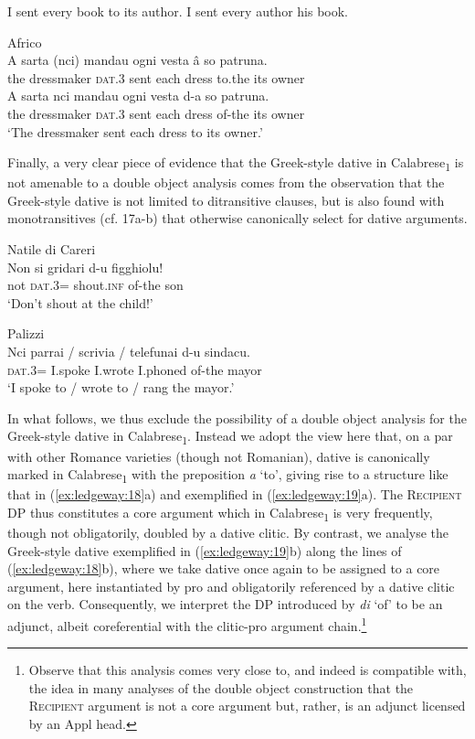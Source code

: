 \documentclass[output=paper,modfonts,nonflat]{langsci/langscibook}
\begin{document}
\ea\label{ex:ledgeway:15}
\ea I sent every book to its author.  
\ex I sent every author his book.
\z
\z

\ea\label{ex:ledgeway:16}
  Africo\\
\ea
	\gll A  sarta  (nci)  mandau  ogni  vesta  â  so patruna.\\
      the  dressmaker  \textsc{dat}.3  sent  each  dress  to.the  its  owner\\
\ex
	\gll A  sarta  nci  mandau  ogni  vesta  d-a  so patruna.\\
      the  dressmaker  \textsc{dat}.3  sent  each  dress  of-the  its     owner\\
      \glt `The dressmaker sent each dress to its owner.'
      \z
      \z

Finally, a very clear piece of evidence that the Greek-style dative in Calabrese\textsubscript{1} is not amenable to a double object analysis comes from the observation that the Greek-style dative is not limited to ditransitive clauses, but is also found with monotransitives (cf. 17a-b) that otherwise canonically select for dative arguments.

\ea\label{ex:ledgeway:17}
\ea Natile di Careri\\
 \gll Non  si  gridari  d-u  figghiolu!\\
    not  \textsc{dat}.3=  shout.\textsc{inf}  of-the  son\\
     \glt `Don’t shout at the child!'

\ex Palizzi  \\
    \gll Nci  parrai  /  scrivia  /  telefunai  d-u  sindacu.\\
    \textsc{dat}.3=  I.spoke    I.wrote    I.phoned  of-the  mayor\\
    \glt `I spoke to / wrote to / rang the mayor.'
    \z
    \z

In what follows, we thus exclude the possibility of a double object analysis for the Greek-style dative in Calabrese\textsubscript{1}. Instead we adopt the view here that, on a par with other Romance varieties (though not Romanian), dative is canonically marked in Calabrese\textsubscript{1} with the preposition \textit{a} ‘to’, giving rise to a structure like that in (\ref{ex:ledgeway:18}a) and exemplified in (\ref{ex:ledgeway:19}a). The \textsc{Recipient} DP thus constitutes a core argument which in Calabrese\textsubscript{1} is very frequently, though not obligatorily, doubled by a dative clitic. By contrast, we analyse the Greek-style dative exemplified in (\ref{ex:ledgeway:19}b) along the lines of (\ref{ex:ledgeway:18}b), where we take dative once again to be assigned to a core argument, here instantiated by pro and obligatorily referenced by a dative clitic on the verb. Consequently, we interpret the DP introduced by \textit{di} ‘of’ to be an adjunct, albeit coreferential with the clitic-pro argument chain.\footnote{Observe that this analysis comes very close to, and indeed is compatible with, the idea in many analyses of the double object construction that the \textsc{Recipient} argument is not a core argument but, rather, is an adjunct licensed by an Appl head.} 
\end{document}
